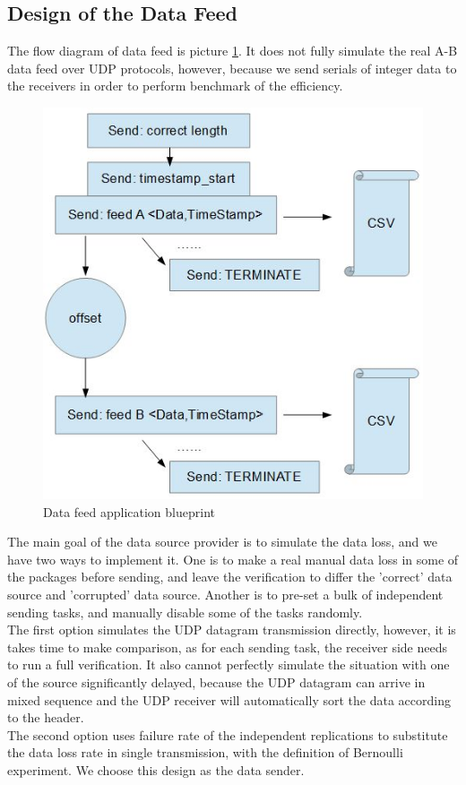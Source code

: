 \documentclass[11pt,openright,a4paper]{report}
\begin{document}
\subsection{Design of the Data Feed}
The flow diagram of data feed is picture \ref{fig:sender-diagram}. It does not fully simulate the real A-B data feed over UDP protocols, however, because we send serials of integer data to the receivers in order to perform benchmark of the efficiency. 
\begin{figure}[H]
\centering
\includegraphics[width=0.5\linewidth]{picture/sender-diagram}
\caption{Data feed application blueprint}
\label{fig:sender-diagram}
\end{figure}
The main goal of the data source provider is to simulate the data loss, and we have two ways to implement it. One is to make a real manual data loss in some of the packages before sending, and leave the verification to differ the 'correct' data source and 'corrupted' data source. Another is to pre-set a bulk of independent sending tasks, and manually disable some of the tasks randomly.\\
The first option simulates the UDP datagram transmission directly, however, it is takes time to make comparison, as for each sending task, the receiver side needs to run a full verification. It also cannot perfectly simulate the situation with one of the source significantly delayed, because the UDP datagram can arrive in mixed sequence and the UDP receiver will automatically sort the data according to the header.\\
The second option uses failure rate of the independent replications to substitute the data loss rate in single transmission, with the definition of Bernoulli experiment\cite{anderberg2014cluster}. We choose this design as the data sender.\\
\end{document}
